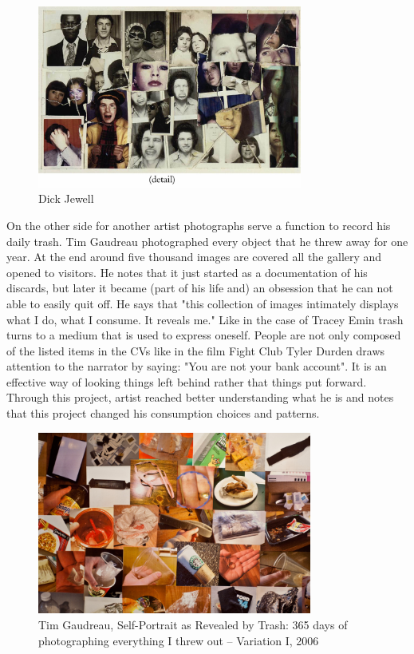 \begin{figure}[h!]
  \centering
  \includegraphics[height=6cm]{graphics/DickJewell_FoundPhotos.jpg}
  \caption{Dick Jewell}
  \label{fig:DickJewell_FoundPhotos}
\end{figure}

On the other side for another artist photographs serve a function to record his daily trash. Tim Gaudreau photographed every object that he threw away for one year. At the end around five thousand images are covered all the gallery and opened to visitors. He notes that it just started as a documentation of his discards, but later it became (part of his life and) an obsession that he can not able to easily quit off. He says that "this collection of images intimately displays what I do, what I consume. It reveals me." Like in the case of Tracey Emin trash turns to a medium that is used to express oneself. People are not only composed of the listed items in the CVs like in the film Fight Club Tyler Durden draws attention to the narrator by saying: "You are not your bank account". It is an effective way of looking things left behind rather that things put forward. Through this project, artist reached better understanding what he is and notes that this project changed his consumption choices and patterns.

\begin{figure}[h!]
  \centering
  \includegraphics[height=6cm]{graphics/TimGaudreau_SelfPotraitRevealedByTrash.jpg}
  \caption{Tim Gaudreau, Self-Portrait as Revealed by Trash: 365 days of photographing everything I threw out – Variation I, 2006}
  \label{fig:TimGaudreau_SelfPotraitRevealedByTrash}
\end{figure}

